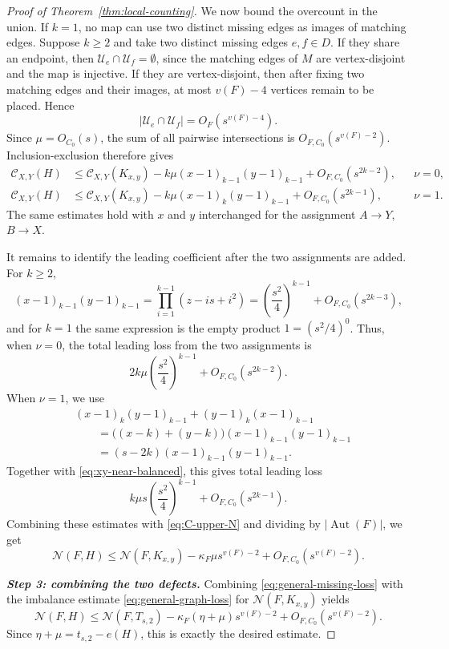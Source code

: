 \documentclass[11pt]{article}
\theoremstyle{definition}
\theoremstyle{plain}
\theoremstyle{remark}
\theoremstyle{plain}
\numberwithin{equation}{section}
\DeclareMathOperator{\Aut}{Aut}
\newcommand{\N}{\mathcal N}
\begin{document}
\begin{proof}[Proof of Theorem~\ref{thm:local-counting}]
We now bound the overcount in the union. If $k=1$, no map can use two distinct missing edges as images of matching edges. Suppose $k\ge2$ and take two distinct missing edges $e,f\in D$. If they share an endpoint, then $\mathcal U_e\cap\mathcal U_f=\emptyset$, since the matching edges of $M$ are vertex-disjoint and the map is injective. If they are vertex-disjoint, then after fixing two matching edges and their images, at most $v(F)-4$ vertices remain to be placed. Hence
\[
        |\mathcal U_e\cap\mathcal U_f|=O_F(s^{v(F)-4}).
\]
Since $\mu=O_{C_0}(s)$, the sum of all pairwise intersections is $O_{F,C_0}(s^{v(F)-2})$. Inclusion-exclusion therefore gives
\begin{align*}
\mathcal C_{X,Y}(H)
&\le \mathcal C_{X,Y}(K_{x,y})
-k\mu(x-1)_{k-1}(y-1)_{k-1}
+O_{F,C_0}(s^{2k-2}), && \nu=0,\\
\mathcal C_{X,Y}(H)
&\le \mathcal C_{X,Y}(K_{x,y})
-k\mu(x-1)_k(y-1)_{k-1}
+O_{F,C_0}(s^{2k-1}), && \nu=1.
\end{align*}
The same estimates hold with $x$ and $y$ interchanged for the assignment $A\to Y$, $B\to X$.

It remains to identify the leading coefficient after the two assignments are added. For $k\ge2$,
\[
        (x-1)_{k-1}(y-1)_{k-1}
        =\prod_{i=1}^{k-1}(z-is+i^2)
        =\left(\frac{s^2}{4}\right)^{k-1}+O_{F,C_0}(s^{2k-3}),
\]
and for $k=1$ the same expression is the empty product $1=(s^2/4)^0$. Thus, when $\nu=0$, the total leading loss from the two assignments is
\[
        2k\mu\left(\frac{s^2}{4}\right)^{k-1}
        +O_{F,C_0}(s^{2k-2}).
\]
When $\nu=1$, we use
\[
\begin{aligned}
        &(x-1)_k(y-1)_{k-1}+(y-1)_k(x-1)_{k-1} \\
        &\qquad =\bigl((x-k)+(y-k)\bigr)(x-1)_{k-1}(y-1)_{k-1} \\
        &\qquad =(s-2k)(x-1)_{k-1}(y-1)_{k-1}.
\end{aligned}
\]
Together with \eqref{eq:xy-near-balanced}, this gives total leading loss
\[
        k\mu s\left(\frac{s^2}{4}\right)^{k-1}
        +O_{F,C_0}(s^{2k-1}).
\]
Combining these estimates with \eqref{eq:C-upper-N} and dividing by $|\Aut(F)|$, we get
\begin{equation}
        \N(F,H)\le \N(F,K_{x,y})
        -\kappa_F\mu s^{v(F)-2}+O_{F,C_0}(s^{v(F)-2}).
        \label{eq:general-missing-loss}
\end{equation}

\medskip
\noindent\emph{\textbf{Step 3: combining the two defects.}}
Combining \eqref{eq:general-missing-loss} with the imbalance estimate \eqref{eq:general-graph-loss} for $\N(F,K_{x,y})$ yields
\[
        \N(F,H)\le \N(F,T_{s,2})
        -\kappa_F(\eta+\mu)s^{v(F)-2}+O_{F,C_0}(s^{v(F)-2}).
\]
Since $\eta+\mu=t_{s,2}-e(H)$, this is exactly the desired estimate.
\end{proof}
\end{document}
